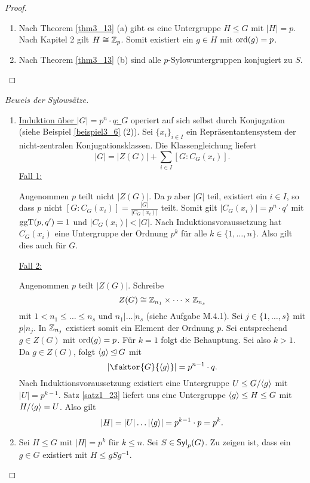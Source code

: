 \begin{proof}
	\begin{enumerate}[label=(\alph*)]
		\item Nach Theorem \ref{thm3_13} (a) gibt es eine Untergruppe $H \leq G$ mit $|H| = p$. Nach Kapitel 2 gilt $H \cong \mathbb{Z}_p$. Somit existiert ein $g \in H$ mit $\mathrm{ord}(g) = p$.
		\item Nach Theorem \ref{thm3_13} (b) sind alle $p$-Sylowuntergruppen konjugiert zu $S$.
	\end{enumerate}
\end{proof}
\begin{proof}[Beweis der Sylowsätze]
	\begin{enumerate}[label=(\alph*)]
		\item \underline{Induktion über $|G| = p^n \cdot q$: } $G$ operiert auf sich selbst durch Konjugation (siehe Beispiel \ref{beispiel3_6} (2)). Sei $\{x_i\}_{i \in I}$ ein Repräsentantensystem der nicht-zentralen Konjugationsklassen. Die Klassengleichung liefert
		\[|G| = |Z(G)| + \sum_{i \in I} [G : C_G(x_i)].\]
		\underline{Fall 1:}
		
		Angenommen $p$ teilt nicht $|Z(G)|$. Da $p$ aber $|G|$ teil, existiert ein $i \in I$, so dass $p$ nicht $[G : C_G(x_i)]=\frac{|G|}{|C_G(x_i)|}$ teilt. Somit gilt $|C_G(x_i)| = p^n \cdot q'$ mit $\mathrm{ggT}(p, q') = 1$ und $|C_G(x_i)| < |G|$. Nach Induktionsvoraussetzung hat $C_G(x_i)$ eine Untergruppe der Ordnung $p^k$ für alle $k \in \{1, \dots, n\}$. Also gilt dies auch für $G$.
		
		\underline{Fall 2:}
		
		Angenommen $p$ teilt $|Z(G)|$. Schreibe 
		\[Z(G) \cong \mathbb{Z}_{n_1} \times \dots \times \mathbb{Z}_{n_s}\]
		mit $1 < n_1 \leq \dots \leq n_s$ und $n_1 \vert \dots \vert n_s$ (siehe Aufgabe M.4.1). Sei $j \in \{1, \dots, s\}$ mit $p \vert n_j$. In $\mathbb{Z}_{n_j}$ existiert somit ein Element der Ordnung $p$. Sei entsprechend $g \in Z(G)$ mit $\mathrm{ord}(g) = p$. Für $k=1$ folgt die Behauptung. Sei also $k > 1$. Da $g \in Z(G)$, folgt $\langle g \rangle \unlhd G$ mit
		\[\left|\faktor{G}{\spn{g}}\right| = p^{n-1} \cdot q.\]
		Nach Induktionsvoraussetzung existiert eine Untergruppe $U \leq G/\langle g \rangle$ mit $|U| = p^{k-1}$. Satz \ref{satz1_23} liefert uns eine Untergruppe $\langle g \rangle \leq H \leq G$ mit $H/\langle g \rangle = U$. Also gilt
		\[|H| = |U| \dots |\langle g \rangle| = p^{k-1} \cdot p = p^k.\]
		\item Sei $H \leq G$ mit $|H| = p^k$ für $k \leq n$. Sei $S \in \mathsf{Syl}_p(G)$. Zu zeigen ist, dass ein $g \in G$ existiert mit $H \leq gSg^{-1}$.
		

\end{enumerate}
\end{proof}
